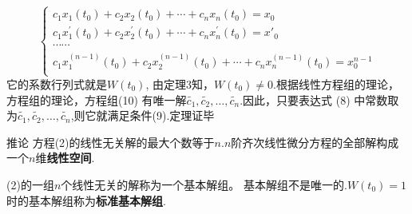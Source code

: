 \documentclass[aspectratio=169, 10pt, utf8, mathserif]{beamer}
\begin{document}
	\begin{frame}
		\begin{equation}
			\begin{cases}
				c_1x_1(t_0)+c_2x_2(t_0)+\cdots +c_nx_n(t_0)=x_0\\
				c_1x_{1}^{\prime}(t_0)+c_2x_{2}^{\prime}(t_0)+\cdots +c_nx_{n}^{\prime}(t_0)=x\prime_0\\
				\cdots \cdots\\
				c_1x_{1}^{(n-1)}(t_0)+c_2x_{2}^{(n-1)}(t_0)+\cdots +c_nx_{n}^{(n-1)}(t_0)=x_{0}^{n-1}\\
			\end{cases}
		\end{equation}
		它的系数行列式就是$W(t_0)$, 由定理3知，$W(t_0)\neq0$.根据线性方程组的理论，方程组的理论，方程组(10) 有唯一解$\tilde{c_1},\tilde{c_2},\ldots,\tilde{c_n}$.因此，只要表达式 (8) 中常数取为$\tilde{c_1},\tilde{c_2},\ldots,\tilde{c_n}$,则它就满足条件(9).定理证毕
	\end{frame}
	\begin{frame}
		\begin{block}{推论}
			方程(2)的线性无关解的最大个数等于$n$.$n$阶齐次线性微分方程的全部解构成一个$n$维\textbf{线性空间}.
			
			 (2)的一组$n$个线性无关的解称为一个基本解组。
			基本解组不是唯一的.$W(t_0)=1$时的基本解组称为\textbf{标准基本解组}.
		\end{block}
	\end{frame}
\end{document}
